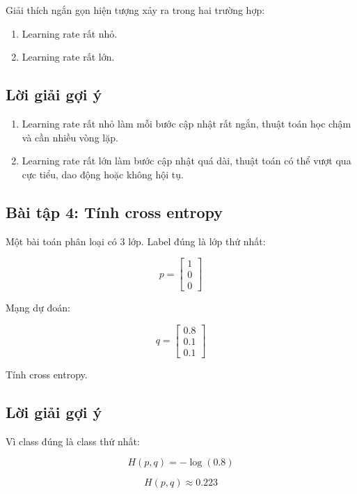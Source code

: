 Giải thích ngắn gọn hiện tượng xảy ra trong hai trường hợp:

\begin{enumerate}
    \item Learning rate rất nhỏ.
    \item Learning rate rất lớn.
\end{enumerate}

\subsection*{Lời giải gợi ý}

\begin{enumerate}
    \item Learning rate rất nhỏ làm mỗi bước cập nhật rất ngắn, thuật toán học chậm và cần nhiều vòng lặp.
    \item Learning rate rất lớn làm bước cập nhật quá dài, thuật toán có thể vượt qua cực tiểu, dao động hoặc không hội tụ.
\end{enumerate}

\subsection*{Bài tập 4: Tính cross entropy}

Một bài toán phân loại có 3 lớp. Label đúng là lớp thứ nhất:

\[
    p =
    \begin{bmatrix}
    1\\0\\0
    \end{bmatrix}
\]

Mạng dự đoán:

\[
    q =
    \begin{bmatrix}
    0.8\\0.1\\0.1
    \end{bmatrix}
\]

Tính cross entropy.

\subsection*{Lời giải gợi ý}

Vì class đúng là class thứ nhất:

\[
    H(p,q)=-\log(0.8)
\]

\[
    H(p,q)\approx 0.223
\]

